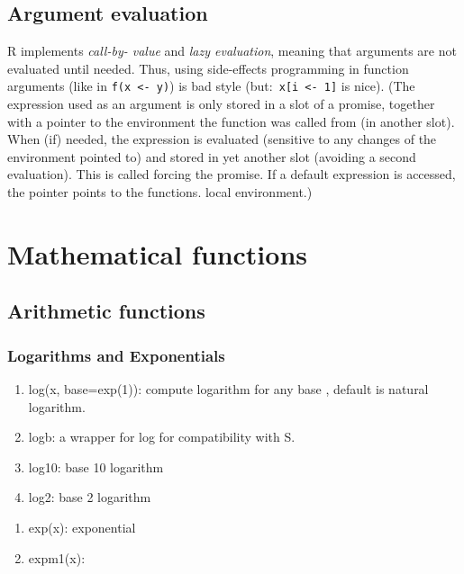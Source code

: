 \subsection{Argument evaluation}
\label{sec:argument-evaluation}


R implements {\it call-by- value} and {\it lazy evaluation}, meaning
that arguments are not evaluated until needed. Thus, using
side-effects programming in function arguments (like in
\lstinline!f(x <- y)!) is bad style (but:\lstinline! x[i <- 1]! is
nice). (The expression used as an argument is only stored in a slot of
a promise, together with a pointer to the environment the function was
called from (in another slot). When (if) needed, the expression is
evaluated (sensitive to any changes of the environment pointed to) and
stored in yet another slot (avoiding a second evaluation). This is
called forcing the promise. If a default expression is accessed, the
pointer points to the functions.  local environment.)

\section{Mathematical functions}
\label{sec:math-funct}

\subsection{Arithmetic functions}
\label{sec:arithmetic-functions}

\subsubsection{Logarithms and Exponentials}
\label{sec:logar-expon}

\begin{enumerate}
\item log(x, base=exp(1)): compute logarithm for any base
, default is natural logarithm.

\item logb: a wrapper for log for compatibility with S.

\item log10: base 10 logarithm

\item log2: base 2 logarithm

\end{enumerate}

\begin{enumerate}
\item exp(x): exponential

\item expm1(x): 
\end{enumerate}
